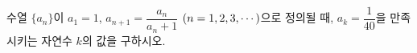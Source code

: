 수열 $\{a_n\}$이 $a_1=1$, $a_{n+1}=\dfrac{a_n}{a_n+1}$ $(n=1{,}\mkern3mu\mathopen{}2{,}\mkern3mu\mathopen{}3{,}\mkern3mu\mathopen{}\cdots)$으로 정의될 때, $a_k=\dfrac{1}{40}$을 만족시키는 자연수 $k$의 값을 구하시오.
